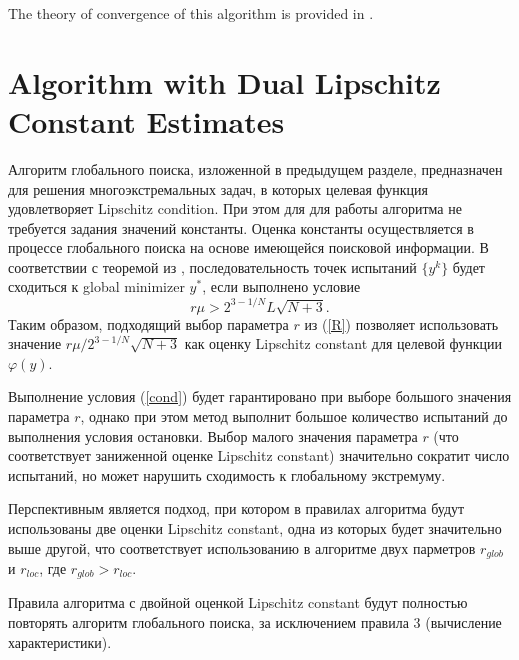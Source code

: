\documentclass[runningheads]{llncs}
\begin{document}
The theory of convergence of this algorithm is provided in \cite{Strongin2000}.


\section{Algorithm with Dual Lipschitz Constant Estimates}

Алгоритм глобального поиска, изложенной в предыдущем разделе, предназначен для решения многоэкстремальных задач, в которых целевая функция удовлетворяет Lipschitz condition. При этом для для работы алгоритма не требуется задания  значений константы. Оценка константы осуществляется в процессе глобального поиска на основе имеющейся поисковой информации. 
В соответствии с теоремой из \cite{Strongin2000}, последовательность точек испытаний $\{y^k\}$ будет сходиться к global minimizer $y^*$, если выполнено условие  
\begin{equation}\label{cond}
r\mu > 2^{3-1/N}L\sqrt{N+3}.
\end{equation}
Таким образом, подходящий выбор параметра $r$ из (\ref{R}) позволяет использовать значение $r\mu / 2^{3-1/N}\sqrt{N+3}$ как оценку Lipschitz constant для целевой функции $\varphi(y)$.

Выполнение условия (\ref{cond}) будет гарантировано при выборе большого значения параметра $r$, однако при этом метод выполнит большое количество испытаний до выполнения условия остановки.
Выбор малого значения параметра $r$ (что соответствует заниженной оценке Lipschitz constant) значительно сократит число испытаний, но может нарушить сходимость к глобальному экстремуму.

Перспективным является подход, при котором в правилах алгоритма будут использованы две оценки Lipschitz constant, одна из которых будет значительно выше другой, что соответствует использованию в алгоритме двух парметров $r_{glob}$ и $r_{loc}$, где $r_{glob} > r_{loc}$.

Правила алгоритма с двойной оценкой Lipschitz constant будут полностью повторять алгоритм глобального поиска, за исключением правила 3 (вычисление характеристики).
\end{document}
